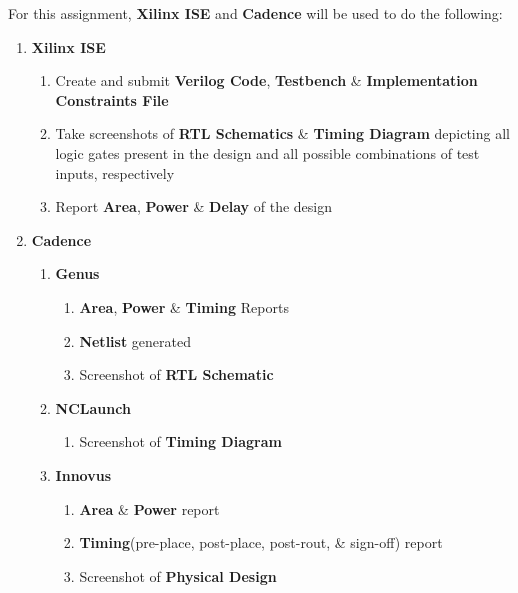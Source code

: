 \documentclass[a4paper,10pt]{report}
\begin{document}
For this assignment, \textbf{Xilinx ISE} and \textbf{Cadence} will be used to do the following:
\begin{enumerate}
	\item \textbf{Xilinx ISE}
		\begin{enumerate}
			\item Create and submit \textbf{Verilog Code}, \textbf{Testbench} \& \textbf{Implementation Constraints File}
			\item Take screenshots of \textbf{RTL Schematics} \& \textbf{Timing Diagram} depicting all logic gates present in the design and all possible combinations of test inputs, respectively
			\item Report \textbf{Area}, \textbf{Power} \& \textbf{Delay} of the design
		\end{enumerate}

	\item \textbf{Cadence}
		\begin{enumerate}
			\item \textbf{Genus}
				\begin{enumerate}
					\item \textbf{Area}, \textbf{Power} \& \textbf{Timing} Reports
					\item \textbf{Netlist} generated
					\item Screenshot of \textbf{RTL Schematic}
				\end{enumerate}
			\item \textbf{NCLaunch}
				\begin{enumerate}
					\item Screenshot of \textbf{Timing Diagram}
				\end{enumerate}
			\item \textbf{Innovus}
				\begin{enumerate}
					\item \textbf{Area} \& \textbf{Power} report
					\item \textbf{Timing}(pre-place, post-place, post-rout, \& sign-off) report
					\item Screenshot of \textbf{Physical Design}
				\end{enumerate}
		\end{enumerate}


\end{enumerate}
\end{document}
